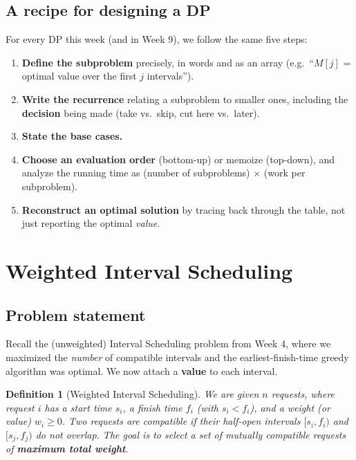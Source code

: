 \documentclass[11pt]{article}
\newtheorem{definition}[theorem]{Definition}
\begin{document}
\subsection{A recipe for designing a DP}

For every DP this week (and in Week 9), we follow the same five steps:
\begin{enumerate}[label=(\arabic*)]
    \item \textbf{Define the subproblem} precisely, in words and as an array
    (e.g.\ ``$M[j]$ = optimal value over the first $j$ intervals'').
    \item \textbf{Write the recurrence} relating a subproblem to smaller ones, including
    the \textbf{decision} being made (take vs.\ skip, cut here vs.\ later).
    \item \textbf{State the base cases.}
    \item \textbf{Choose an evaluation order} (bottom-up) or memoize (top-down), and
    analyze the running time as (number of subproblems) $\times$ (work per subproblem).
    \item \textbf{Reconstruct an optimal solution} by tracing back through the table, not
    just reporting the optimal \emph{value}.
\end{enumerate}

\section{Weighted Interval Scheduling}

\subsection{Problem statement}

Recall the (unweighted) Interval Scheduling problem from Week 4, where we maximized the
\emph{number} of compatible intervals and the earliest-finish-time greedy algorithm was
optimal. We now attach a \textbf{value} to each interval.

\begin{definition}[Weighted Interval Scheduling]
We are given $n$ requests, where request $i$ has a start time $s_i$, a finish time $f_i$
(with $s_i < f_i$), and a \emph{weight} (or value) $w_i \ge 0$. Two requests are
\emph{compatible} if their half-open intervals $[s_i, f_i)$ and $[s_j, f_j)$ do not
overlap. The goal is to select a set of mutually compatible requests of \textbf{maximum
total weight}.
\end{definition}
\end{document}
